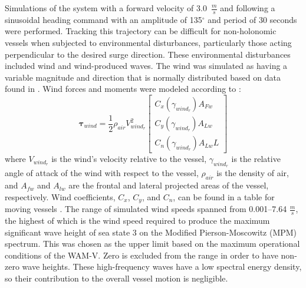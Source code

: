 \documentclass[letterpaper, 10 pt, conference]{ieeeconf}  %
\begin{document}
Simulations of the system with a forward velocity of 3.0~$\frac{m}{s}$ and following a sinusoidal heading command with an amplitude of 135\ensuremath{^\circ} and period of 30 seconds were performed. Tracking this trajectory can be difficult for non-holonomic vessels when subjected to environmental disturbances, particularly those acting perpendicular to the desired surge direction. These environmental disturbances included wind and wind-produced waves. The wind was simulated as having a variable magnitude and direction that is normally distributed based on data found in \cite{Joffre:87a}. Wind forces and moments were modeled according to \cite{Fossen:11c}:
%
\begin{equation}
\bm{\tau}_{wind} =
\frac{1}{2}\rho_{air}V_{wind_r}^2
\left[
\begin{matrix}
C_x(\gamma_{wind_r})A_{Fw}\\
C_y(\gamma_{wind_r})A_{Lw}\\
C_n(\gamma_{wind_r})A_{Lw}L
\end{matrix}
\right]
\end{equation}
%
where $V_{wind_r}$ is the wind's velocity relative to the vessel, $\gamma_{wind_r}$ is the relative angle of attack of the wind with respect to the vessel, $\rho_{air}$ is the density of air, and $A_{fw}$ and $A_{lw}$ are the frontal and lateral projected areas of the vessel, respectively. Wind coefficients, $C_x$, $C_y$, and $C_n$, can be found in a table for moving vessels \cite{Fossen:11c}. The range of simulated wind speeds spanned from 0.001--7.64 $\frac{m}{s}$, the highest of which is the wind speed required to produce the maximum significant wave height of sea state 3 on the Modified Pierson-Moscowitz (MPM) spectrum.  This was chosen as the upper limit based on the maximum operational conditions of the WAM-V. Zero is excluded from the range in order to have non-zero wave heights. These high-frequency waves have a low spectral energy density, so their contribution to the overall vessel motion is negligible.
\end{document}
